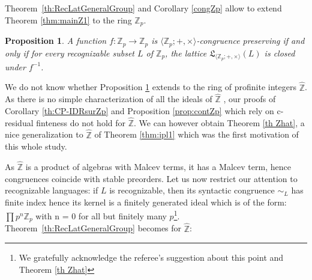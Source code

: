 \documentclass[11pt,a4paper]{article}
\newtheorem{proposition}[theorem]{Proposition}
\theoremstyle{definition} %
\newcommand\+[1]{\mathcal{#1}} %
\newcommand{\Z}{{\mathbb Z}}     %
\newcommand{\Latt}{{\mathfrak{L}}}
\newcommand{\Zhat}{\widehat{\Z}}
\newcommand{\gen}{\textit{gen}}
\begin{document}

%
 Theorem~\ref{th:RecLatGeneralGroup} and Corollary \ref{congZp} allow 
to extend  Theorem \ref{thm:mainZ1}   to the ring $ \Z_p$.

\begin{proposition}\label{prop:CPlatZp}
 A function $f:\Z_p\to\Z_p$ is $\langle \Z_p;+,\times\rangle$-congruence preserving if and only if for every  recognizable subset $L$ of $\Z_p$, the lattice $\Latt_{\langle \Z_p;+,\times\rangle}(L)$ is  closed under $f^{-1}$.
\end{proposition}
%

We do not know whether  Proposition \ref {prop:CPlatZp}  extends to the ring of profinite integers $\Zhat$. As there is no simple characterization of all the ideals of $\Zhat$  \cite{lenstra2}, 
 our proofs of Corollary \ref{th:CP-IDRsurZp} and Proposition \ref{prop:contZp} which rely on c-residual finteness  do not hold for $\Zhat$.  
 We can however obtain  Theorem \ref{th Zhat}, a nice generalization to $\Zhat$  of Theorem \ref{thm:ipl1} which was the first motivation of this whole study.
 
 As $\Zhat$ is a product of algebras with Malcev terms, it has a Malcev term, hence congruences coincide with stable preorders.
 Let us now restrict our attention to  recognizable languages: if $L$ is recognizable, then its syntactic congruence $\sim_L$ has finite index hence its kernel is a finitely generated ideal \cite{lenstra2} which is of the form: 
 $ \prod{p^n} \Z_p$ with n = 0 for all but finitely many $p$\footnote {We gratefully acknowledge the referee's suggestion about this point and Theorem \ref{th Zhat}}.  Theorem~\ref{th:RecLatGeneralGroup} becomes for $\Zhat$:
 
\end{document}
